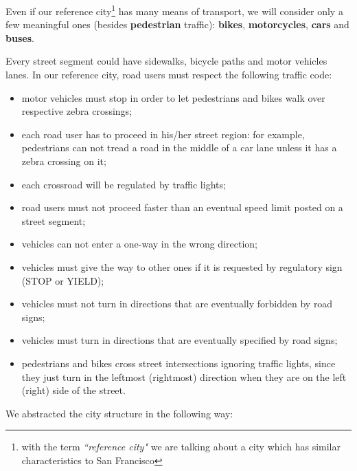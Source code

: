Even if our reference city\footnote{with the term \emph{``reference city"}
we are talking about a city which has similar characteristics to San
Francisco} has many means of transport, we will consider only a few meaningful
ones (besides \textbf{pedestrian} traffic): \textbf{bikes},
\textbf{motorcycles}, \textbf{cars} and \textbf{buses}.

Every street segment could have sidewalks, bicycle paths and motor vehicles
lanes. In our reference city, road users must respect the following traffic
code:

\begin{itemize}
\item motor vehicles must stop in order to let pedestrians and bikes walk over
  respective zebra crossings;
\item each road user has to proceed in his/her street region: for example,
  pedestrians can not tread a road in the middle of a car lane unless it has a
  zebra crossing on it;
\item each crossroad will be regulated by traffic lights;
\item road users must not proceed faster than an eventual speed limit posted
  on a street segment;
\item vehicles can not enter a one-way in the wrong direction;
\item vehicles must give the way to other ones if it is requested by
  regulatory sign (STOP or YIELD);
\item vehicles must not turn in directions that are eventually forbidden by
  road signs;
\item vehicles must turn in directions that are eventually specified by road
  signs;
\item pedestrians and bikes cross street intersections ignoring traffic lights,
  since they just turn in the leftmost (rightmost) direction when they are on
  the left (right) side of the street.
\end{itemize}

We abstracted the city structure in the following way:

